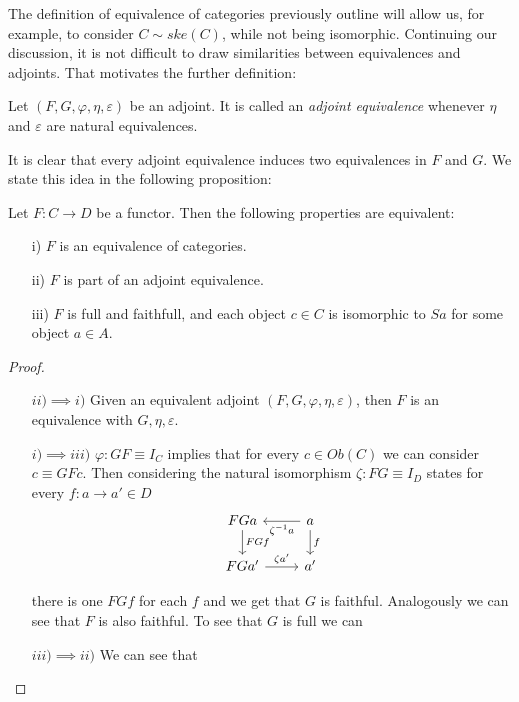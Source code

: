   The definition of equivalence of categories previously outline will allow us, for example, to consider $C\sim ske(C)$, while not being isomorphic. Continuing our discussion, it is not difficult to draw similarities between equivalences and adjoints. That motivates the further definition:
  \begin{definition}
    Let $(F,G,\varphi,\eta,\varepsilon)$ be an adjoint. It is called an \emph{adjoint equivalence} whenever $\eta$ and $\varepsilon$ are natural equivalences.
  \end{definition}
  It is clear that every adjoint equivalence induces two equivalences in $F$ and $G$. We state this idea in the following proposition:
  \begin{proposition}\cite[Theorem 1, 4.4]{mac2013categories}
    Let $F:C\to D$ be a functor. Then the following properties are equivalent:
    \begin{itemize}
    \item[i)] $F$ is an equivalence of categories.
    \item[ii)] $F$ is part of an adjoint equivalence. 
    \item[iii)] $F$ is full and faithfull, and each object $c\in C$ is isomorphic to $Sa$ for some object $a\in A$. 
    \end{itemize}  
  \end{proposition}
  \begin{proof}\
    \

    
    \begin{itemize}
    \item[$ii)\implies i)$] Given an equivalent adjoint $(F,G,\varphi,\eta,\varepsilon)$, then $F$ is an equivalence with $G,\eta,\varepsilon$. 
    \item[$i)\implies iii)$] $\varphi: GF\equiv I_C$ implies that for every $c\in Ob(C)$ we can consider $c\equiv GFc$. Then considering the natural isomorphism $\zeta: FG\equiv I_D$ states for every $f:a\to a'\in D$
\[
\begin{tikzcd}
  FGa \arrow{d}{FG f}& a\arrow{d}{f}\arrow{l}{\zeta^{-1} a}\\
  FGa' \arrow{r}{\zeta a'}& a'
\end{tikzcd}
\]

 there is one $FG f$ for each $f$ and we get that $G$ is faithful. Analogously we can see that $F$ is also faithful. To see that $G$ is full we can 
    \item[$iii)\implies ii)$] We can see that 
    \end{itemize}
  \end{proof}


